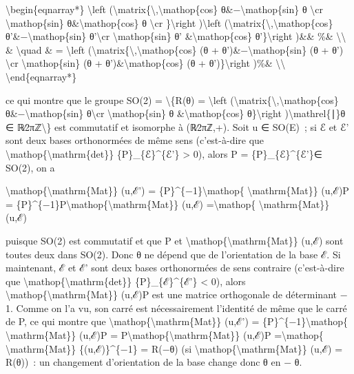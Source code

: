 \documentclass[]{article}
\begin{document}
\textbackslash{}begin\{eqnarray*\} \textbackslash{}left
(\textbackslash{}matrix\{\textbackslash{},\textbackslash{}mathop\{cos\}
θ\&−\textbackslash{}mathop\{sin\} θ \textbackslash{}cr
\textbackslash{}mathop\{sin\} θ\&\textbackslash{}mathop\{cos\} θ
\textbackslash{}cr \}\textbackslash{}right )\textbackslash{}left
(\textbackslash{}matrix\{\textbackslash{},\textbackslash{}mathop\{cos\}
θ'\&−\textbackslash{}mathop\{sin\} θ'\textbackslash{}cr
\textbackslash{}mathop\{sin\} θ' \&\textbackslash{}mathop\{cos\}
θ'\}\textbackslash{}right )\&\& \%\& \textbackslash{}\textbackslash{} \&
\textbackslash{}quad \& = \textbackslash{}left
(\textbackslash{}matrix\{\textbackslash{},\textbackslash{}mathop\{cos\}
(θ + θ')\&−\textbackslash{}mathop\{sin\} (θ + θ') \textbackslash{}cr
\textbackslash{}mathop\{sin\} (θ + θ')\&\textbackslash{}mathop\{cos\} (θ
+ θ')\}\textbackslash{}right )\%\& \textbackslash{}\textbackslash{}
\textbackslash{}end\{eqnarray*\}

ce qui montre que le groupe SO(2) = \textbackslash{}\{R(θ) =
\textbackslash{}left
(\textbackslash{}matrix\{\textbackslash{},\textbackslash{}mathop\{cos\}
θ\&−\textbackslash{}mathop\{sin\} θ\textbackslash{}cr
\textbackslash{}mathop\{sin\} θ \&\textbackslash{}mathop\{cos\}
θ\}\textbackslash{}right )\textbackslash{}mathrel\{∣\}θ ∈
ℝ∕2πℤ\textbackslash{}\} est commutatif et isomorphe à (ℝ∕2πℤ,+). Soit u
∈ SO(E)~; si ℰ et ℰ' sont deux bases orthonormées de même sens
(c'est-à-dire que
\textbackslash{}mathop\{\textbackslash{}mathrm\{det\}\}
\{P\}\_\{ℰ\}\^{}\{ℰ'\} \textgreater{} 0), alors P =
\{P\}\_\{ℰ\}\^{}\{ℰ'\}∈ SO(2), on a

\textbackslash{}mathop\{\textbackslash{}mathrm\{Mat\}\} (u,ℰ') =
\{P\}\^{}\{−1\}\textbackslash{}mathop\{ \textbackslash{}mathrm\{Mat\}\}
(u,ℰ)P =
\{P\}\^{}\{−1\}P\textbackslash{}mathop\{\textbackslash{}mathrm\{Mat\}\}
(u,ℰ) =\textbackslash{}mathop\{ \textbackslash{}mathrm\{Mat\}\} (u,ℰ)

puisque SO(2) est commutatif et que P et
\textbackslash{}mathop\{\textbackslash{}mathrm\{Mat\}\} (u,ℰ) sont
toutes deux dans SO(2). Donc θ ne dépend que de l'orientation de la base
ℰ. Si maintenant, ℰ et ℰ' sont deux bases orthonormées de sens contraire
(c'est-à-dire que
\textbackslash{}mathop\{\textbackslash{}mathrm\{det\}\}
\{P\}\_\{ℰ\}\^{}\{ℰ'\} \textless{} 0), alors
\textbackslash{}mathop\{\textbackslash{}mathrm\{Mat\}\} (u,ℰ)P est une
matrice orthogonale de déterminant − 1. Comme on l'a vu, son carré est
nécessairement l'identité de même que le carré de P, ce qui montre que
\textbackslash{}mathop\{\textbackslash{}mathrm\{Mat\}\} (u,ℰ') =
\{P\}\^{}\{−1\}\textbackslash{}mathop\{ \textbackslash{}mathrm\{Mat\}\}
(u,ℰ)P = P\textbackslash{}mathop\{\textbackslash{}mathrm\{Mat\}\} (u,ℰ)P
=\textbackslash{}mathop\{ \textbackslash{}mathrm\{Mat\}\}
\{(u,ℰ)\}\^{}\{−1\} = R(−θ) (si
\textbackslash{}mathop\{\textbackslash{}mathrm\{Mat\}\} (u,ℰ) = R(θ))~:
un changement d'orientation de la base change donc θ en − θ.
\end{document}
